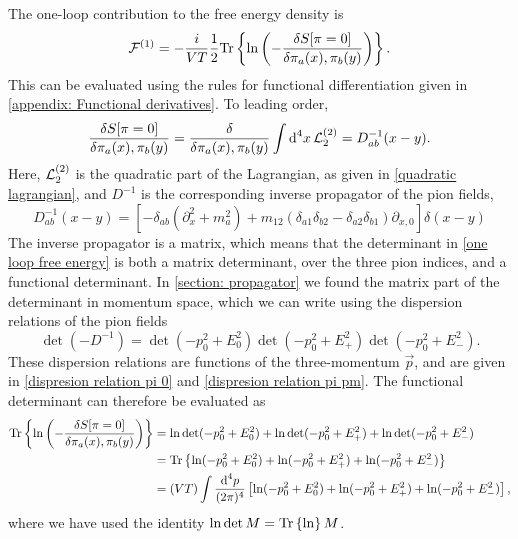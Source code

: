 The one-loop contribution to the free energy density is
%
\begin{equation}
    \label{one loop free energy}
    \Eff^{(1)}
    = - \frac{i}{V T} \frac{1}{2}
    \Tr{\ln\left( -\fdv{S[\pi = 0]}{\pi_a(x), \pi_b(y)} \right)}.
\end{equation}
%
This can be evaluated using the rules for functional differentiation given in \autoref{appendix: Functional derivatives}.
To leading order,
%
\begin{align}
    \fdv{S[\pi = 0]}{\pi_a(x), \pi_b(y)}
    = \fdv{}{\pi_a(x), \pi_b(y)}
    \int \dd^4 x \, \Ell^{(2)}_2
    = D_{ab}^{-1}(x - y).
\end{align}
%
Here, $\mathcal{L}^{(2)}_2$ is the quadratic part of the Lagrangian, as given in \autoref{quadratic lagrangian}, and $D^{-1}$ is the corresponding inverse propagator of the pion fields,
\begin{equation}
    D_{ab}^{-1}(x-y) = 
    \left[
        - \delta_{ab}(\partial_x^2 + m^2_a)
        + m_{12}(\delta_{a1} \delta_{b2} - \delta_{a2}\delta_{b1}) \partial_{x, 0}
    \right] \delta(x-y)
\end{equation}
%
The inverse propagator is a matrix, which means that the determinant in \autoref{one loop free energy} is both a matrix determinant, over the three pion indices, and a functional determinant.
In \autoref{section: propagator} we found the matrix part of the determinant in momentum space, which we can write using the dispersion relations of the pion fields
\begin{equation}
    \det(- D^{-1}) = \det(-p_0^2 + E_0^2) \det(-p_0^2 + E_+^2) \det(-p_0^2 + E_-^2).
\end{equation}
%
These dispersion relations are functions of the three-momentum $\vec p$, and are given in \autoref{dispresion relation pi 0} and \autoref{dispresion relation pi pm}.
The functional determinant can therefore be evaluated as
%
\begin{align}
    \nonumber
    \Tr{\ln\left( -\fdv{S[\pi = 0]}{\pi_a(x), \pi_b(y)} \right)}
    & = \ln \det(-p_0^2 + E_0^2) + \ln \det(-p_0^2 + E_+^2) + \ln \det(-p_0^2 + E_-^2) \\
    \nonumber
    & = \Tr{ \ln(-p_0^2 + E_0^2) + \ln(-p_0^2 + E_+^2)+  \ln(-p_0^2 + E_-^2) } \\
    & = (VT) \int \frac{\dd^4 p}{(2 \pi)^4} 
    \left[ \ln(-p_0^2 + E_0^2) + \ln(-p_0^2 + E_+^2) + \ln(-p_0^2 + E_-^2)  \right],
\end{align}
%
where we have used the identity $\ln\det M = \text{Tr} \left\{ \ln \right\} M $.

